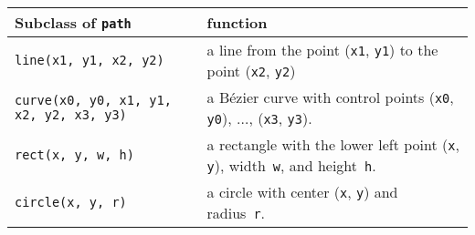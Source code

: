 \medskip
\begin{tabularx}{\linewidth}{l>{\raggedright\arraybackslash}X}
Subclass of \texttt{path} & function \\
\hline
\texttt{line(x1, y1, x2, y2)} & a line from the point
  (\texttt{x1}, \texttt{y1}) to the point (\texttt{x2}, \texttt{y2})\\
\texttt{curve(x0, y0, x1, y1, x2, y2, x3, y3)} & a B\'ezier curve with 
control points  (\texttt{x0}, \texttt{y0}), $\dots$, (\texttt{x3}, \texttt{y3}).\\
\texttt{rect(x, y, w, h)} &  a rectangle with the
  lower left point (\texttt{x}, \texttt{y}), width~\texttt{w}, and
  height~\texttt{h}. \\
\texttt{circle(x, y, r)} & a circle with 
  center (\texttt{x}, \texttt{y}) and radius~\texttt{r}.
\end{tabularx}
\medskip





